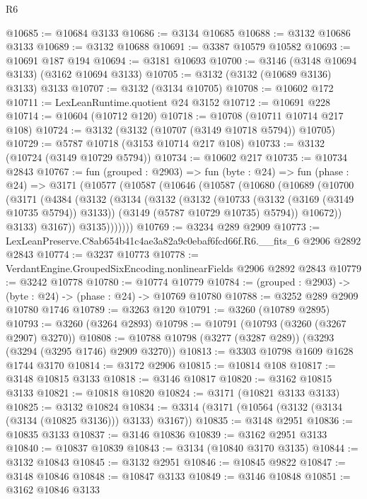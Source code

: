 \begin{lexlean}{R6}
\begin{coremodule}
@10685 := @10684 @3133
@10686 := @3134 @10685
@10688 := @3132 @10686 @3133
@10689 := @3132 @10688
@10691 := @3387 @10579 @10582
@10693 := @10691 @187 @194
@10694 := @3181 @10693
@10700 := @3146 (@3148 @10694 @3133) (@3162 @10694 @3133)
@10705 := @3132 (@3132 (@10689 @3136) @3133) @3133
@10707 := @3132 (@3134 @10705)
@10708 := @10602 @172
@10711 := LexLeanRuntime.quotient @24 @3152
@10712 := @10691 @228
@10714 := @10604 (@10712 @120)
@10718 := @10708 (@10711 @10714 @217 @108)
@10724 := @3132 (@3132 (@10707 (@3149 @10718 @5794)) @10705)
@10729 := @5787 @10718 (@3153 @10714 @217 @108)
@10733 := @3132 (@10724 (@3149 @10729 @5794))
@10734 := @10602 @217
@10735 := @10734 @2843
@10767 := fun (grouped : @2903) =>
  fun (byte : @24) =>
  fun (phase : @24) =>
  @3171
    (@10577
      (@10587
        (@10646
          (@10587
            (@10680
              (@10689
                (@10700
                  (@3171
                    (@4384
                      (@3132
                        (@3134
                          (@3132
                            (@3132
                              (@10733 (@3132 (@3169 (@3149 @10735 @5794)) @3133))
                              (@3149 (@5787 @10729 @10735) @5794))
                            @10672))
                        @3133)
                      @3167))
                  @3135)))))))
@10769 := @3234 @289 @2909
@10773 := LexLeanPreserve.C8ab654b41c4ae3a82a9c0ebaf6fcd66f.R6.__fits_6 @2906 @2892 @2843
@10774 := @3237 @10773
@10778 := VerdantEngine.GroupedSixEncoding.nonlinearFields @2906 @2892 @2843
@10779 := @3242 @10778
@10780 := @10774 @10779
@10784 := (grouped : @2903) -> (byte : @24) -> (phase : @24) -> @10769 @10780
@10788 := @3252 @289 @2909 @10780 @1746
@10789 := @3263 @120
@10791 := @3260 (@10789 @2895)
@10793 := @3260 (@3264 @2893)
@10798 := @10791 (@10793 (@3260 (@3267 @2907) @3270))
@10808 := @10788 @10798 (@3277 (@3287 @289)) (@3293 (@3294 (@3295 @1746) @2909 @3270))
@10813 := @3303 @10798 @1609 @1628 @1744 @3170
@10814 := @3172 @2906
@10815 := @10814 @108
@10817 := @3148 @10815 @3133
@10818 := @3146 @10817
@10820 := @3162 @10815 @3133
@10821 := @10818 @10820
@10824 := @3171 (@10821 @3133 @3133)
@10825 := @3132 @10824
@10834 := @3314 (@3171 (@10564 (@3132 (@3134 (@3134 (@10825 @3136))) @3133) @3167))
@10835 := @3148 @2951
@10836 := @10835 @3133
@10837 := @3146 @10836
@10839 := @3162 @2951 @3133
@10840 := @10837 @10839
@10843 := @3134 (@10840 @3170 @3135)
@10844 := @3132 @10843
@10845 := @3132 @2951
@10846 := @10845 @9822
@10847 := @3148 @10846
@10848 := @10847 @3133
@10849 := @3146 @10848
@10851 := @3162 @10846 @3133

\end{coremodule}
\end{lexlean}
